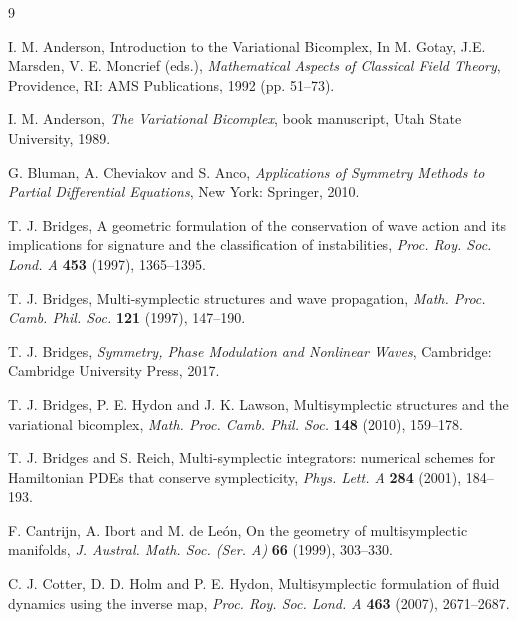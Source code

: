 \documentclass[11pt]{article} %
\numberwithin{equation}{section}
\theoremstyle{plain}
\theoremstyle{definition}
\begin{document}
\begin{thebibliography}{9}


 I. M. Anderson, Introduction to the Variational Bicomplex, In M. Gotay, J.E. Marsden, V. E. Moncrief (eds.), {\it Mathematical Aspects of Classical Field Theory}, Providence, RI: AMS Publications, 1992 (pp. 51--73).

 I. M. Anderson, {\it The Variational Bicomplex}, book manuscript, Utah State University, 1989.
            
  G. Bluman, A. Cheviakov and S. Anco, {\it Applications of Symmetry Methods to Partial Differential Equations}, New York: Springer, 2010.
 

 T. J. Bridges, A geometric formulation of the conservation of wave action and its implications for signature and the classification of instabilities, {\it Proc. Roy. Soc. Lond. A} {\bf 453} (1997), 1365--1395.

 T. J. Bridges, Multi-symplectic structures and wave propagation, {\it Math. Proc. Camb. Phil. Soc.} {\bf 121} (1997), 147--190.

 T. J. Bridges, {\it Symmetry, Phase Modulation and Nonlinear Waves}, Cambridge: Cambridge University Press, 2017.


 T. J. Bridges, P. E. Hydon and J. K. Lawson, Multisymplectic structures and the variational bicomplex, {\it Math. Proc. Camb. Phil. Soc.} {\bf 148} (2010), 159--178.

 T. J. Bridges and S. Reich, Multi-symplectic integrators: numerical schemes for Hamiltonian PDEs that conserve symplecticity, {\it Phys. Lett. A} {\bf 284} (2001), 184--193.

 F. Cantrijn, A. Ibort and M. de Le\'{o}n, On the geometry of multisymplectic manifolds, {\it J. Austral. Math. Soc. (Ser. A)} {\bf 66} (1999), 303--330.

 C. J. Cotter, D. D. Holm and P. E. Hydon, Multisymplectic formulation of fluid dynamics using the inverse map, {\it Proc. Roy. Soc. Lond. A} {\bf 463} (2007), 2671--2687.


\end{thebibliography}
\end{document}
